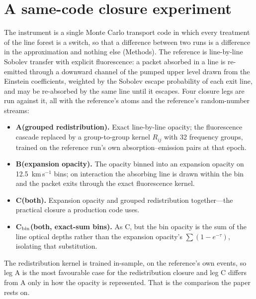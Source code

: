 \documentclass[11pt]{article}
\newcommand{\Cboth}{C\xspace}
\newcommand{\Cbin}{C$_{\rm bin}$\xspace}
\newcommand{\Aleg}{A\xspace}
\newcommand{\Bleg}{B\xspace}
\newcommand{\Rij}{R_{ij}}
\begin{document}
\section{A same-code closure experiment}\label{sec:experiment}

The instrument is a single Monte Carlo transport code in which every treatment of the line forest is a switch, so that a difference between two runs is a difference in the approximation and nothing else (Methods). The reference is line-by-line Sobolev transfer with explicit fluorescence: a packet absorbed in a line is re-emitted through a downward channel of the pumped upper level drawn from the Einstein coefficients, weighted by the Sobolev escape probability of each exit line, and may be re-absorbed by the same line until it escapes. Four closure legs are run against it, all with the reference's atoms and the reference's random-number streams:

\begin{itemize}\setlength{\itemsep}{0pt}
\item \textbf{\Aleg (grouped redistribution).} Exact line-by-line opacity; the fluorescence cascade replaced by a group-to-group kernel $\Rij$ with 32 frequency groups, trained on the reference run's own absorption--emission pairs at that epoch.
\item \textbf{\Bleg (expansion opacity).} The opacity binned into an expansion opacity on 12.5~km\,s$^{-1}$ bins; on interaction the absorbing line is drawn within the bin and the packet exits through the exact fluorescence kernel.
\item \textbf{\Cboth (both).} Expansion opacity and grouped redistribution together---the practical closure a production code uses.
\item \textbf{\Cbin (both, exact-sum bins).} As \Cboth, but the bin opacity is the sum of the line optical depths rather than the expansion opacity's $\sum(1-e^{-\tau})$, isolating that substitution.
\end{itemize}

The redistribution kernel is trained in-sample, on the reference's own events, so leg \Aleg is the most favourable case for the redistribution closure and leg \Cboth differs from \Aleg only in how the opacity is represented. That is the comparison the paper rests on.
\end{document}
